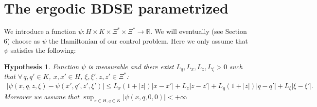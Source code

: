 \documentclass[reqno,a4paper,11 pt]{article}
\def \E {\mathbb{E}}
\def \R {\mathbb{R}}
\newtheorem{lemma}[theorem]{Lemma}
\newtheorem{hypothesis}[theorem]{Hypothesis}
\numberwithin{equation}{section}
\def\Dim{\noindent\hbox{{\bf Proof.}$\;\; $}}          %
\def\finedim{{\hfill\hbox{\enspace${ \square}$}} \smallskip}    %
\def\sqr#1#2{{\vcenter{\vbox{\hrule height .#2pt
     \hbox{\vrule width .#2pt height#1pt \kern#1pt \vrule
     width .#2pt} \hrule height .#2pt}}}}
\def\square{\mathchoice\sqr54\sqr54\sqr{4.1}3\sqr{3.5}3}
\begin{document}

\section{The ergodic BDSE parametrized}
We introduce a function $\psi: H\times K\times \Xi^* \times \Xi^* \to \R$. We will eventually (see Section 6) choose as $\psi$ the Hamiltonian of our control problem. Here we only assume that $\psi$ satisfies the following:
\begin{hypothesis}\label{B.3} Function $\psi$ is   measurable and there exist $L_q,  L_x, L_z ,L_\xi >0$ such that $\forall  \, q,q' \in K$,  $x, x' \in H$, $ \xi, \xi', z, z' \in \Xi^*$:
 \begin{multline*}|\psi(x, q,z ,\xi) - \psi(x', q', z', \xi')| \leq L_x (1+|z|)|x-x'| +  L_z |z-z'|+ L_q(1+|z|)|q-q'| +  L_\xi |\xi-\xi'|.%
\end{multline*}
Moreover we assume that  $\sup_{x\in H,q\in K} |\psi (x,q,0, 0)|<+\infty $
\end{hypothesis}
\end{document}
